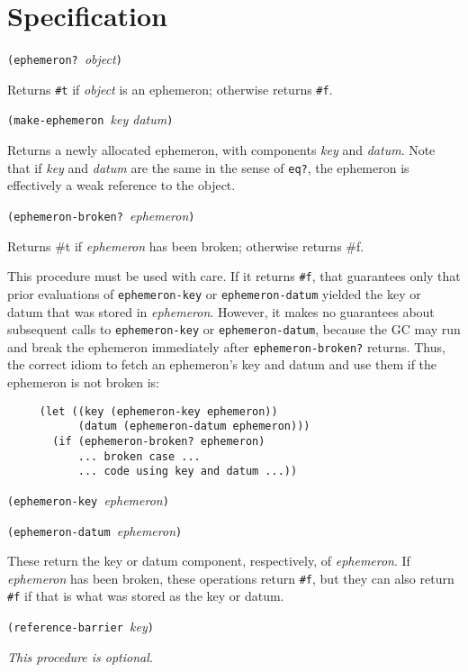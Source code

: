 \section{Specification}\label{specification}

\texttt{(ephemeron?\ }\emph{object}\texttt{)}

Returns \texttt{\#t} if \emph{object} is an ephemeron; otherwise returns
\texttt{\#f}.

\texttt{(make-ephemeron\ }\emph{key datum}\texttt{)}

Returns a newly allocated ephemeron, with components \emph{key} and
\emph{datum}. Note that if \emph{key} and \emph{datum} are the same in
the sense of \texttt{eq?}, the ephemeron is effectively a weak reference
to the object.

\texttt{(ephemeron-broken?\ }\emph{ephemeron}\texttt{)}

Returns \#t if \emph{ephemeron} has been broken; otherwise returns \#f.

This procedure must be used with care. If it returns \texttt{\#f}, that
guarantees only that prior evaluations of \texttt{ephemeron-key} or
\texttt{ephemeron-datum} yielded the key or datum that was stored in
\emph{ephemeron}. However, it makes no guarantees about subsequent calls
to \texttt{ephemeron-key} or \texttt{ephemeron-datum}, because the GC
may run and break the ephemeron immediately after
\texttt{ephemeron-broken?} returns. Thus, the correct idiom to fetch an
ephemeron's key and datum and use them if the ephemeron is not broken
is:

\begin{verbatim}
     (let ((key (ephemeron-key ephemeron))
           (datum (ephemeron-datum ephemeron)))
       (if (ephemeron-broken? ephemeron)
           ... broken case ...
           ... code using key and datum ...))
\end{verbatim}

\texttt{(ephemeron-key\ }\emph{ephemeron}\texttt{)}

\texttt{(ephemeron-datum\ }\emph{ephemeron}\texttt{)}

These return the key or datum component, respectively, of
\emph{ephemeron}. If \emph{ephemeron} has been broken, these operations
return \texttt{\#f}, but they can also return \texttt{\#f} if that is
what was stored as the key or datum.

\texttt{(reference-barrier\ }\emph{key}\texttt{)}

\emph{This procedure is optional.}

